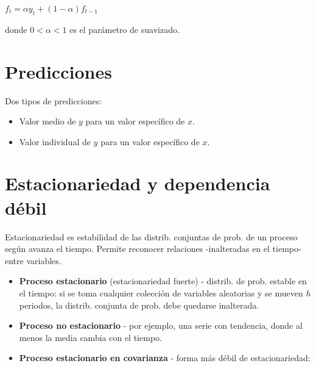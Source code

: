 \documentclass[10pt, a4paper, landscape]{article}
\newcommand{\E}{\mathrm{E}}
\newcommand{\Var}{\mathrm{Var}}
\begin{document}
\begin{multicols}{3}
		\begin{center}
			$f_{t} = \alpha y_{t} + (1 - \alpha) f_{t - 1}$
		\end{center}
		
		donde $0 < \alpha < 1$ es el parámetro de suavizado.
		
		\section*{Predicciones}
		
		Dos tipos de predicciones:
		
		\begin{itemize}[leftmargin=*]
			\item Valor medio de $y$ para un valor específico de $x$.
			\item Valor individual de $y$ para un valor específico de $x$.
		\end{itemize}
		
		\columnbreak
		
		\section*{Estacionariedad y dependencia débil}
		
		Estacionariedad es estabilidad de las distrib. conjuntas de prob. de un proceso según avanza el tiempo. Permite reconocer relaciones -inalteradas en el tiempo- entre variables.
		
		\begin{itemize}[leftmargin=*]
			\item \textbf{Proceso estacionario} (estacionariedad fuerte) - distrib. de prob. estable en el tiempo: si se toma cualquier colección de variables aleatorias y se mueven $h$ periodos, la distrib. conjunta de prob. debe quedarse inalterada.
			\item \textbf{Proceso no estacionario} - por ejemplo, una serie con tendencia, donde al menos la media cambia con el tiempo.
			\item \textbf{Proceso estacionario en covarianza} - forma más débil de estacionariedad:
			
			\begin{itemize}[leftmargin=*]
				

\end{itemize}
\end{itemize}
\end{multicols}
\end{document}
